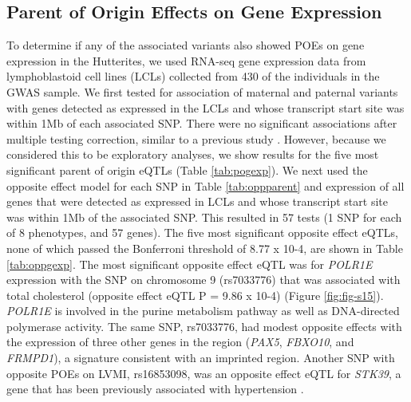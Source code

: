 \subsection{Parent of Origin Effects on Gene Expression}\label{Parent of Origin Effects on Gene Expression}

To determine if any of the associated variants also showed POEs on gene expression in the Hutterites, we used RNA-seq gene expression data from lymphoblastoid cell lines (LCLs) collected from 430 of the individuals in the GWAS sample. We first tested for association of maternal and paternal variants with genes detected as expressed in the LCLs and whose transcript start site was within 1Mb of each associated SNP. There were no significant associations after multiple testing correction, similar to a previous study \cite{Benonisdottir:2016dz}. However, because we considered this to be exploratory analyses, we show results for the five most significant parent of origin eQTLs (Table \ref{tab:pogexp}). We next used the opposite effect model for each SNP in Table \ref{tab:oppparent} and expression of all genes that were detected as expressed in LCLs and whose transcript start site was within 1Mb of the associated SNP. This resulted in 57 tests (1 SNP for each of 8 phenotypes, and 57 genes). The five most significant opposite effect eQTLs, none of which passed the Bonferroni threshold of 8.77 x 10-4, are shown in Table \ref{tab:oppgexp}. The most significant opposite effect eQTL was for \emph{POLR1E} expression with the SNP on chromosome 9 (rs7033776) that was associated with total cholesterol (opposite effect eQTL P = 9.86 x 10-4) (Figure \ref{fig:fig-s15}). \emph{POLR1E} is involved in the purine metabolism pathway as well as DNA-directed polymerase activity. The same SNP, rs7033776, had modest opposite effects with the expression of three other genes in the region (\emph{PAX5}, \emph{FBXO10}, and \emph{FRMPD1}), a signature consistent with an imprinted region. Another SNP with opposite POEs on LVMI, rs16853098, was an opposite effect eQTL for \emph{STK39}, a gene that has been previously associated with hypertension \cite{Wang:2009bt}.



